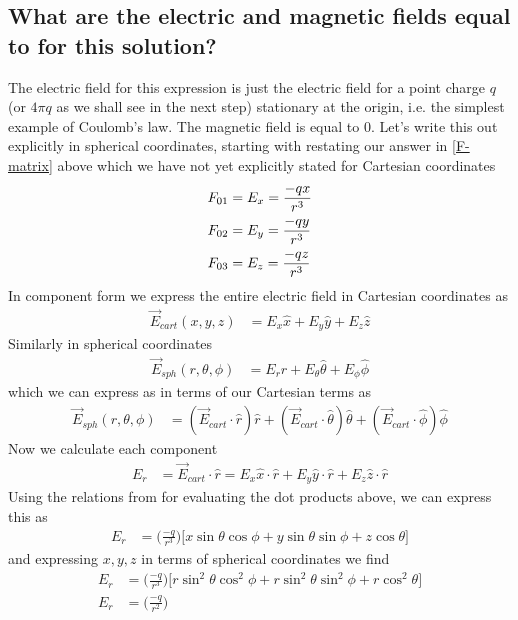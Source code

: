 \subsection{What are the electric and magnetic fields equal to for this solution?}
The electric field for this expression is just the electric field for a point charge $q$ (or $4 \pi q$ as we shall see in the next step) stationary at the origin, i.e. the simplest example of Coulomb's law. The magnetic field is equal to $0$. Let's write this out explicitly in spherical coordinates, starting with restating our answer in \ref{F-matrix} above which we have not yet explicitly stated for Cartesian coordinates
%
\begin{align}
	F_{0 1} &= E_x = \frac{-q x}{r^3} \notag \\
	F_{0 2} &= E_y = \frac{-q y}{r^3} \\
	F_{0 3} &= E_z = \frac{-q z}{r^3} \notag
\end{align}
%
In component form we express the entire electric field in Cartesian coordinates as
%
\begin{align}
	\vec{E}_{cart}(x, y, z) &= E_x \hat{x} + E_y \hat{y} + E_z \hat{z} 
\end{align}
%
Similarly in spherical coordinates 
%
\begin{align}
	\vec{E}_{sph}(r, \theta, \phi) &= E_r \hat{r} + E_{\theta} \hat{\theta} + E_{\phi} \hat{\phi} 
\end{align}
%
which we can express as in terms of our Cartesian terms as 
%
\begin{align}
	\vec{E}_{sph}(r, \theta, \phi) &= (\vec{E}_{cart} \cdot \hat{r}) \hat{r} +(\vec{E}_{cart} \cdot \hat{\theta}) \hat{\theta} + (\vec{E}_{cart} \cdot \hat{\phi}) \hat{\phi} 
\end{align}
%
Now we calculate each component
%
\begin{align}
	E_r &= \vec{E}_{cart} \cdot \hat{r} = E_x \hat{x} \cdot \hat{r} + E_y \hat{y} \cdot \hat{r} + E_z \hat{z} \cdot \hat{r}
\end{align}
%
Using the relations from \cite{wiki:Vector_fields_in_cylindrical_and_spherical_coordinates} for evaluating the dot products above, we can express this as
%
\begin{align}
	E_r &= \bigg( \frac{-q}{r^3} \bigg) \big[ x \sin{\theta} \cos{\phi} + y \sin{\theta} \sin{\phi} + z \cos{\theta} \big]
\end{align}
%
and expressing $x, y, z$ in terms of spherical coordinates we find
%
\begin{align}
	E_r &= \bigg( \frac{-q}{r^3} \bigg) \big[ r \sin^2{\theta} \cos^2{\phi} + r \sin^2{\theta} \sin^2{\phi} + r \cos^2{\theta} \big] \\ 
	E_r & = \bigg( \frac{-q}{r^2} \bigg)
\end{align}
